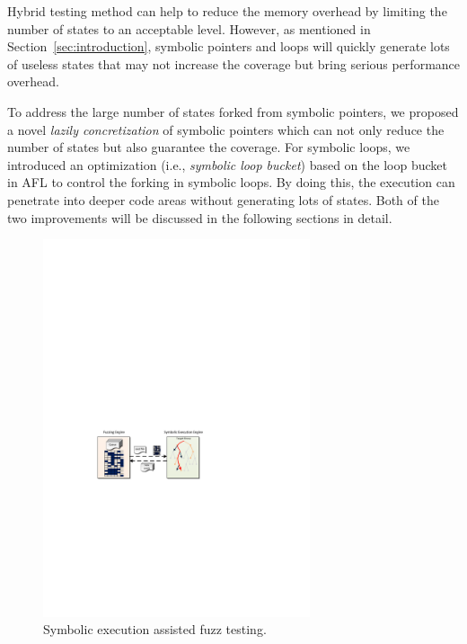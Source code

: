 Hybrid testing method can help to reduce the memory overhead by limiting the number of states to an acceptable level. However, as mentioned in Section~\ref{sec:introduction}, symbolic pointers and loops will quickly generate lots of useless states that may not increase the coverage but bring serious performance overhead.

To address the large number of states forked from symbolic pointers, we proposed a novel \textit{lazily concretization} of symbolic pointers which can not only reduce the number of states but also guarantee the coverage. 
For symbolic loops, we introduced an optimization (i.e., \textit{symbolic loop bucket}) based on the loop bucket in AFL to control the forking in symbolic loops. By doing this, the execution can penetrate into deeper code areas without generating lots of states.
Both of the two improvements will be discussed in the following sections in detail.

\begin{figure}
\centering
\includegraphics[width=0.7\textwidth]{figures/s2e-assist.pdf} 
\caption{Symbolic execution assisted fuzz testing.}\label{s2e-assist}
\end{figure}

